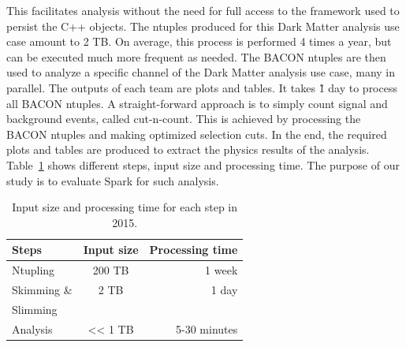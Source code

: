 \documentclass[11pt, twocolumn]{article}
\begin{document}
This facilitates analysis without the need for full access to the framework 
used to persist the C++ objects. The ntuples produced for this Dark Matter 
analysis use case amount to 2 TB. On average, this process is performed 
4 times a year, but can be executed much more frequent as needed. 
The BACON ntuples are then used to analyze a specific channel of 
the Dark Matter analysis use case, many in parallel. 
The outputs of each team are plots and tables. 
It takes \~1 day to process all BACON ntuples. 
A straight-forward approach is to simply count signal and background events, 
called cut-n-count. This is achieved by processing the BACON ntuples 
and making optimized selection cuts. In the end, the required plots
 and tables are produced to extract the physics results of the analysis.
 Table~\ref{tab:1} shows different steps, input size and processing time. 
 The purpose of our study is to evaluate Spark for such analysis. 

\begin{table}[h]
\begin{tabular}{ l | c | r }
\hline
  Steps & Input size & Processing time \\
  \hline
  Ntupling & 200 TB & ~ 1 week \\
  \hline
  Skimming \&  &2 TB  & ~ 1 day\\
  Slimming & & \\
  \hline
  Analysis &  << 1 TB & 5-30 minutes\\
  \hline
\end{tabular}
\caption{Input size and processing time for each step in 2015.}
  \label{tab:1}
  \end{table}

\end{document}
